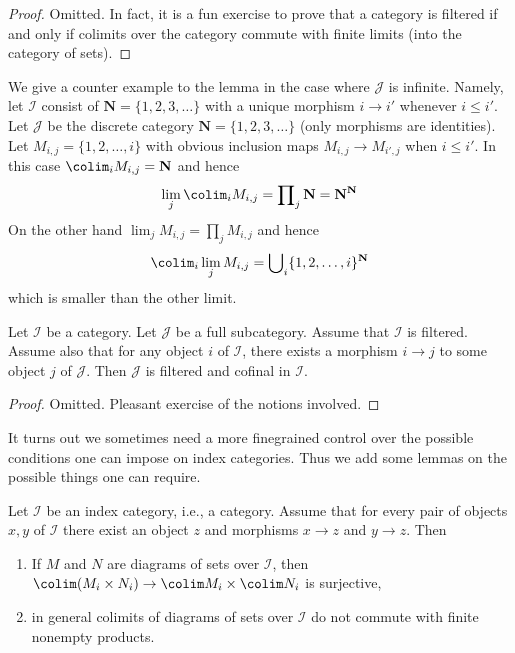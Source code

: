 \begin{proof}
Omitted. In fact, it is a fun exercise to prove that a category is
filtered if and only if colimits over the category commute with finite
limits (into the category of sets).
\end{proof}

\noindent
We give a counter example to the lemma in
the case where $\mathcal{J}$ is infinite. Namely, let
$\mathcal{I}$ consist of $\mathbf{N} = \{1, 2, 3, \ldots\}$
with a unique morphism $i \to i'$ whenever $i \leq i'$.
Let $\mathcal{J}$ be the discrete category
$\mathbf{N} = \{1, 2, 3, \ldots\}$ (only morphisms are identities).
Let $M_{i, j} = \{1, 2, \ldots, i\}$ with obvious inclusion maps
$M_{i, j} \to M_{i', j}$ when $i \leq i'$. In this case
$\colim_i M_{i, j} = \mathbf{N}$ and hence
$$
\lim_j \colim_i M_{i, j}
=
\prod\nolimits_j \mathbf{N}
=
\mathbf{N}^\mathbf{N}
$$
On the other hand $\lim_j M_{i, j} = \prod\nolimits_j M_{i, j}$ and
hence
$$
\colim_i \lim_j M_{i, j}
=
\bigcup\nolimits_i \{1, 2, \ldots, i\}^{\mathbf{N}}
$$
which is smaller than the other limit.

\begin{lemma}
\label{lemma-cofinal-in-filtered}
\begin{reference}
\cite[Proposition 3.2.4]{KS}
\end{reference}
Let $\mathcal{I}$ be a category. Let $\mathcal{J}$ be a full subcategory.
Assume that $\mathcal{I}$ is filtered. Assume also that for any object
$i$ of $\mathcal{I}$, there exists a morphism $i \to j$
to some object $j$ of $\mathcal{J}$. Then $\mathcal{J}$
is filtered and cofinal in $\mathcal{I}$.
\end{lemma}

\begin{proof}
Omitted. Pleasant exercise of the notions involved.
\end{proof}

\noindent
It turns out we sometimes need a more finegrained control over the
possible conditions one can impose on index categories. Thus we add
some lemmas on the possible things one can require.

\begin{lemma}
\label{lemma-preserve-products}
Let $\mathcal{I}$ be an index category, i.e., a category. Assume
that for every pair of objects $x, y$ of $\mathcal{I}$
there exist an object $z$ and morphisms $x \to z$ and $y \to z$.
Then
\begin{enumerate}
\item If $M$ and $N$ are diagrams of sets over $\mathcal{I}$,
then $\colim (M_i \times N_i) \to \colim M_i \times \colim N_i$
is surjective,
\item in general colimits of diagrams of sets over $\mathcal{I}$
do not commute with finite nonempty products.
\end{enumerate}
\end{lemma}

